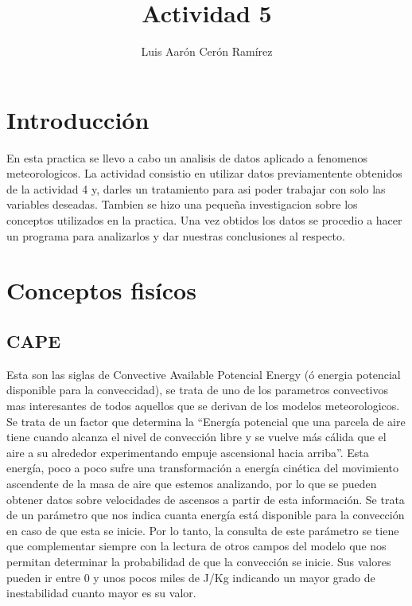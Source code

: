 \documentclass{article}
\title{Actividad 5}
\author{Luis Aarón Cerón Ramírez}
\begin{document}
\maketitle
\section{Introducción}
En esta practica se llevo a cabo un analisis de datos aplicado a fenomenos meteorologicos. La actividad consistio en utilizar datos previamentente obtenidos de la actividad 4 y, darles un tratamiento para asi poder trabajar con solo las variables deseadas. Tambien se hizo una pequeña investigacion sobre los conceptos utilizados en la practica. Una vez obtidos los datos se procedio a hacer un programa para analizarlos y dar nuestras conclusiones al respecto.
\section{Conceptos fisícos}
\subsection{CAPE}
Esta son las siglas de Convective Available Potencial Energy (ó energia potencial disponible para la conveccidad), se trata de uno de los parametros convectivos mas interesantes de todos aquellos que se derivan de los modelos meteorologicos.
\newline
Se trata de un factor que determina la “Energía potencial que una parcela de aire tiene cuando alcanza el nivel de convección libre y se vuelve más cálida que el aire a su alrededor experimentando empuje ascensional hacia arriba”. Esta energía, poco a poco sufre una transformación a energía cinética del movimiento ascendente de la masa de aire que estemos analizando, por lo que se pueden obtener datos sobre velocidades de ascensos a partir de esta información.
\newline
Se trata de un parámetro que nos indica cuanta energía está disponible para la convección en caso de que esta se inicie. Por lo tanto, la consulta de este parámetro se tiene que complementar siempre con la lectura de otros campos del modelo que nos permitan determinar la probabilidad de que la convección se inicie.
\newline
Sus valores pueden ir entre 0 y unos pocos miles de J/Kg indicando un mayor grado de inestabilidad cuanto mayor es su valor.
\end{document}

